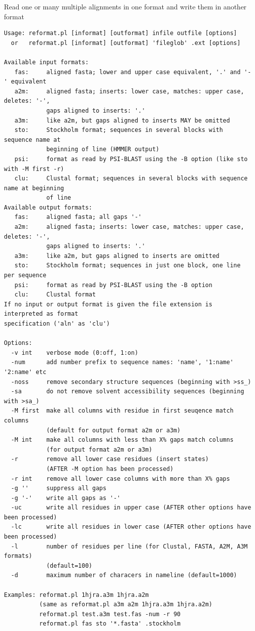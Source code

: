 \documentclass[11pt,a4paper]{article}
\begin{document}
Read one or many multiple alignments in one format and write them in another format

\small 
\begin{verbatim}
Usage: reformat.pl [informat] [outformat] infile outfile [options] 
  or   reformat.pl [informat] [outformat] 'fileglob' .ext [options] 

Available input formats:
   fas:     aligned fasta; lower and upper case equivalent, '.' and '-' equivalent
   a2m:     aligned fasta; inserts: lower case, matches: upper case, deletes: '-',
            gaps aligned to inserts: '.'
   a3m:     like a2m, but gaps aligned to inserts MAY be omitted
   sto:     Stockholm format; sequences in several blocks with sequence name at 
            beginning of line (HMMER output)
   psi:     format as read by PSI-BLAST using the -B option (like sto with -M first -r)
   clu:     Clustal format; sequences in several blocks with sequence name at beginning 
            of line
Available output formats:
   fas:     aligned fasta; all gaps '-'
   a2m:     aligned fasta; inserts: lower case, matches: upper case, deletes: '-', 
            gaps aligned to inserts: '.'
   a3m:     like a2m, but gaps aligned to inserts are omitted
   sto:     Stockholm format; sequences in just one block, one line per sequence
   psi:     format as read by PSI-BLAST using the -B option 
   clu:     Clustal format
If no input or output format is given the file extension is interpreted as format 
specification ('aln' as 'clu')

Options:
  -v int    verbose mode (0:off, 1:on)
  -num      add number prefix to sequence names: 'name', '1:name' '2:name' etc
  -noss     remove secondary structure sequences (beginning with >ss_)
  -sa       do not remove solvent accessibility sequences (beginning with >sa_)
  -M first  make all columns with residue in first seuqence match columns 
            (default for output format a2m or a3m)
  -M int    make all columns with less than X% gaps match columns 
            (for output format a2m or a3m)
  -r        remove all lower case residues (insert states) 
            (AFTER -M option has been processed)
  -r int    remove all lower case columns with more than X% gaps
  -g ''     suppress all gaps
  -g '-'    write all gaps as '-'
  -uc       write all residues in upper case (AFTER other options have been processed)
  -lc       write all residues in lower case (AFTER other options have been processed)
  -l        number of residues per line (for Clustal, FASTA, A2M, A3M formats) 
            (default=100)
  -d        maximum number of characers in nameline (default=1000)

Examples: reformat.pl 1hjra.a3m 1hjra.a2m  
          (same as reformat.pl a3m a2m 1hjra.a3m 1hjra.a2m)
          reformat.pl test.a3m test.fas -num -r 90
          reformat.pl fas sto '*.fasta' .stockholm
\end{verbatim} 
\normalsize
\end{document}
